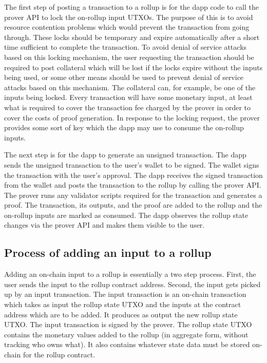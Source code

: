 \documentclass[12pt]{article}
\begin{document}
The first step of posting a transaction to a rollup is for the dapp code to call the prover API to lock the on-rollup input UTXOs. The purpose of this is to avoid resource contention problems which would prevent the transaction from going through. These locks should be temporary and expire automatically after a short time sufficient to complete the transaction. To avoid denial of service attacks based on this locking mechanism, the user requesting the transaction should be required to post collateral which will be lost if the locks expire without the inputs being used, or some other means should be used to prevent denial of service attacks based on this mechanism. The collateral can, for example, be one of the inputs being locked. Every transaction will have some monetary input, at least what is required to cover the transaction fee charged by the prover in order to cover the costs of proof generation. In response to the locking request, the prover provides some sort of key which the dapp may use to consume the on-rollup inputs. 

The next step is for the dapp to generate an unsigned transaction. The dapp sends the unsigned transaction to the user's wallet to be signed. The wallet signs the transaction with the user's approval. The dapp receives the signed transaction from the wallet and posts the transaction to the rollup by calling the prover API. The prover runs any validator scripts required for the transaction and generates a proof. The transaction, its outputs, and the proof are added to the rollup and the on-rollup inputs are marked as consumed. The dapp observes the rollup state changes via the prover API and makes them visible to the user.


\subsection{Process of adding an input to a rollup}

Adding an on-chain input to a rollup is essentially a two step process. First, the user sends the input to the rollup contract address. Second, the input gets picked up by an input transaction. The input transaction is an on-chain transaction which takes as input the rollup state UTXO and the inputs at the contract address which are to be added. It produces as output the new rollup state UTXO. The input transaction is signed by the prover. The rollup state UTXO contains the monetary values added to the rollup (in aggregate form, without tracking who owns what). It also contains whatever state data must be stored on-chain for the rollup contract.
\end{document}
